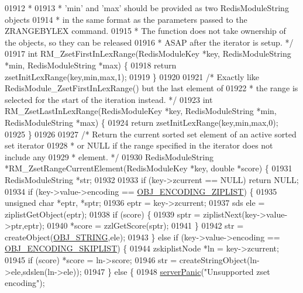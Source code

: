 \begin{DoxyCode}
{{{01912 \textcolor{comment}{ *}
01913 \textcolor{comment}{ * 'min' and 'max' should be provided as two RedisModuleString objects}
01914 \textcolor{comment}{ * in the same format as the parameters passed to the ZRANGEBYLEX command.}
01915 \textcolor{comment}{ * The function does not take ownership of the objects, so they can be released}
01916 \textcolor{comment}{ * ASAP after the iterator is setup. */}
01917 \textcolor{keywordtype}{int} RM\_ZsetFirstInLexRange(RedisModuleKey *key, RedisModuleString *min, RedisModuleString *max) \{
01918     \textcolor{keywordflow}{return} zsetInitLexRange(key,min,max,1);
01919 \}
01920 
01921 \textcolor{comment}{/* Exactly like RedisModule\_ZsetFirstInLexRange() but the last element of}
01922 \textcolor{comment}{ * the range is selected for the start of the iteration instead. */}
01923 \textcolor{keywordtype}{int} RM\_ZsetLastInLexRange(RedisModuleKey *key, RedisModuleString *min, RedisModuleString *max) \{
01924     \textcolor{keywordflow}{return} zsetInitLexRange(key,min,max,0);
01925 \}
01926 
01927 \textcolor{comment}{/* Return the current sorted set element of an active sorted set iterator}
01928 \textcolor{comment}{ * or NULL if the range specified in the iterator does not include any}
01929 \textcolor{comment}{ * element. */}
01930 RedisModuleString *RM\_ZsetRangeCurrentElement(RedisModuleKey *key, \textcolor{keywordtype}{double} *score) \{
01931     RedisModuleString *str;
01932 
01933     \textcolor{keywordflow}{if} (key->zcurrent == NULL) \textcolor{keywordflow}{return} NULL;
01934     \textcolor{keywordflow}{if} (key->value->encoding == \hyperlink{server_8h_aabf064ede983103f1fd0df2086e84eee}{OBJ\_ENCODING\_ZIPLIST}) \{
01935         \textcolor{keywordtype}{unsigned} \textcolor{keywordtype}{char} *eptr, *sptr;
01936         eptr = key->zcurrent;
01937         sds ele = ziplistGetObject(eptr);
01938         \textcolor{keywordflow}{if} (score) \{
01939             sptr = ziplistNext(key->value->ptr,eptr);
01940             *score = zzlGetScore(sptr);
01941         \}
01942         str = createObject(\hyperlink{server_8h_a65236ea160f69cdef33ec942092af88f}{OBJ\_STRING},ele);
01943     \} \textcolor{keywordflow}{else} \textcolor{keywordflow}{if} (key->value->encoding == \hyperlink{server_8h_acfb35db5cb30ed113ed23aeb1a224c4c}{OBJ\_ENCODING\_SKIPLIST}) \{
01944         zskiplistNode *ln = key->zcurrent;
01945         \textcolor{keywordflow}{if} (score) *score = ln->score;
01946         str = createStringObject(ln->ele,sdslen(ln->ele));
01947     \} \textcolor{keywordflow}{else} \{
01948         \hyperlink{server_8h_a11cc378e7778a830b41240578de3b204}{serverPanic}(\textcolor{stringliteral}{"Unsupported zset encoding"});
}}}
\end{DoxyCode}
